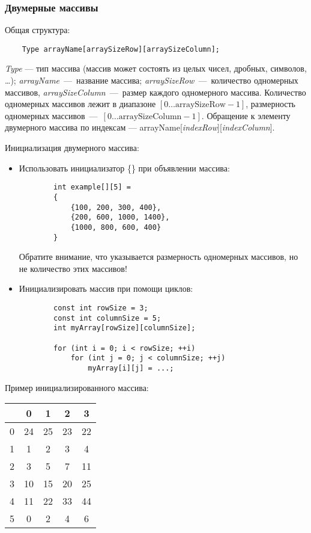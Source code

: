 \subsubsection{Двумерные массивы}
Общая структура:
\begin{lstlisting}
    Type arrayName[arraySizeRow][arraySizeColumn];
\end{lstlisting}

\textit{Type} --- тип массива (массив может состоять из целых чисел, дробных, символов, \ldots); \textit{arrayName}~---~название массива; \textit{arraySizeRow}~---~количество одномерных массивов, \textit{arraySizeColumn}~---~размер каждого одномерного массива. Количество одномерных массивов лежит в диапазоне $\left[ 0 \ldots \text{arraySizeRow} - 1 \right]$, размерность одномерных массивов~---~$\left[ 0 \ldots \text{arraySizeColumn} - 1 \right]$. Обращение к элементу двумерного массива по индексам --- arrayName[\textit{indexRow}][\textit{indexColumn}].

Инициализация двумерного массива:
\begin{itemize}
    \item Использовать инициализатор \{\} при объявлении массива:
    \begin{lstlisting}
        int example[][5] =
        {
            {100, 200, 300, 400},
            {200, 600, 1000, 1400},
            {1000, 800, 600, 400}
        }
    \end{lstlisting}

    Обратите внимание, что указывается размерность одномерных массивов, но не количество этих массивов!

    \item Инициализировать массив при помощи циклов:
    \begin{lstlisting}
        const int rowSize = 3;
        const int columnSize = 5;
        int myArray[rowSize][columnSize];

        for (int i = 0; i < rowSize; ++i)
            for (int j = 0; j < columnSize; ++j)
                myArray[i][j] = ...;
    \end{lstlisting}
\end{itemize}

Пример инициализированного массива:

\begin{tabular}{|c|c|c|c|c|}
    \hline
      & 0 & 1 & 2 & 3 \\
    \hline
    0 & 24 & 25 & 23 & 22 \\
    \hline
    1 & 1 & 2 & 3 & 4 \\
    \hline
    2 & 3 & 5 & 7 & 11 \\
    \hline
    3 & 10 & 15 & 20 & 25 \\
    \hline
    4 & 11 & 22 & 33 & 44 \\
    \hline
    5 & 0 & 2 & 4 & 6 \\
    \hline
\end{tabular}